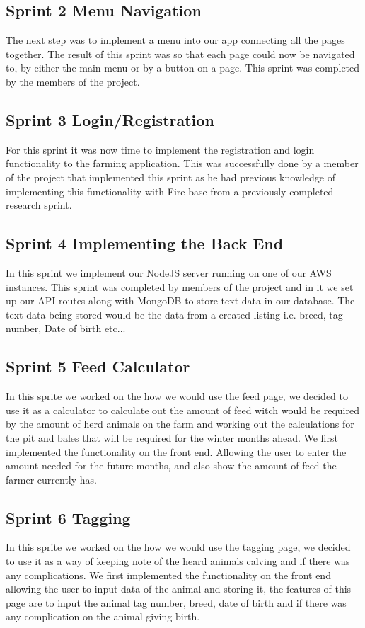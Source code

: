 \documentclass[12pt,a4paper,oneside,openany]{book}
\begin{document}
\subsection{Sprint 2 Menu Navigation}
The next step was to implement a menu into our app connecting all the pages together. The result of this sprint was so that each page could now be navigated to, by either the main menu or by a button on a page. This sprint was completed by the members of the project.

\subsection{Sprint 3 Login/Registration}
For this sprint it was now time to implement the registration and login functionality to the farming application. This was successfully done by a member of the project that implemented this sprint as he had previous knowledge of implementing this functionality with Fire-base from a previously completed research sprint.

\subsection{Sprint 4 Implementing the Back End}
In this sprint we implement our NodeJS server running on one of our AWS instances. This sprint was completed by members of the project and in it we set up our API routes along with MongoDB to store text data in our database. The text data being stored would be the data from a created listing i.e. breed, tag number, Date of birth etc...

\subsection{Sprint 5 Feed Calculator}
In this sprite we worked on the how we would use the feed page, we decided to use it as a calculator to calculate out the amount of feed witch would be required by the amount of herd animals on the farm and working out the calculations for the pit and bales that will be required for the winter months ahead. We first implemented the functionality on the front end. Allowing the user to enter the amount needed for the future months, and also show the amount of feed the farmer currently has.

\subsection{Sprint 6 Tagging}
In this sprite we worked on the how we would use the tagging page, we decided to use it as a way of keeping note of the heard animals calving and if there was any complications. We first implemented the functionality on the front end allowing the user to input data of the animal and storing it, the features of this page are to input the animal tag number, breed, date of birth and if there was any complication on the animal giving birth. 
\end{document}
